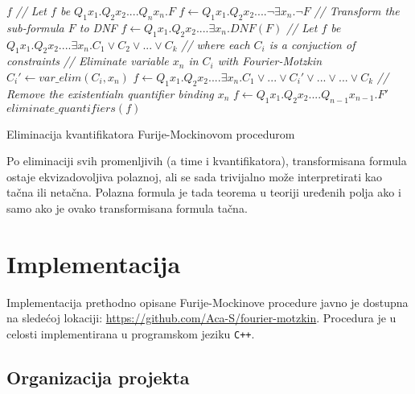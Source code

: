 \documentclass[a4paper,10pt]{article}
\begin{document}
\begin{algorithm}[!ht]
    \begin{algorithmic}[1]
                \State \Return $f$
            \EndIf
            \State \textit{// Let $f$ be $Q_1x_1.Q_2x_2....Q_nx_n.F$}
                \State $f \gets Q_1x_1.Q_2x_2....\neg \exists x_n. \neg F$
            \EndIf
            \State \textit{// Transform the sub-formula $F$ to DNF}
            \State $f \gets Q_1x_1.Q_2x_2....\exists x_n.DNF(F)$
            \State \textit{// Let $f$ be $Q_1x_1.Q_2x_2....\exists x_n.C_1 \lor C_2 \lor ... \lor C_k$}
            \State \textit{// where each $C_i$ is a conjuction of constraints}
                \State \textit{// Eliminate variable $x_n$ in $C_i$ with Fourier-Motzkin}
                \State $C_i' \gets var\_elim(C_i, x_n)$
                \State $f \gets Q_1x_1.Q_2x_2....\exists x_n.C_1 \lor ... \lor C_i' \lor ... \lor ... \lor C_k$
            \EndFor
            \State \textit{// Remove the existentialn quantifier binding $x_n$}
            \State $f \gets Q_1x_1.Q_2x_2....Q_{n-1}x_{n-1}.F'$
            \State \Return $eliminate\_quantifiers(f)$
        \EndFunction
    \end{algorithmic}
    \caption{Eliminacija kvantifikatora Furije-Mockinovom procedurom}
    \label{alg:fm_fol_formula}
\end{algorithm}

Po eliminaciji svih promenljivih (a time i kvantifikatora), transformisana formula ostaje ekvizadovoljiva polaznoj, ali se sada trivijalno može interpretirati kao tačna ili netačna. Polazna formula je tada teorema u teoriji uređenih polja ako i samo ako je ovako transformisana formula tačna.

\section{Implementacija}
\label{sec:implementacija}

Implementacija prethodno opisane Furije-Mockinove procedure javno je dostupna na sledećoj lokaciji: \url{https://github.com/Aca-S/fourier-motzkin}. Procedura je u celosti implementirana u programskom jeziku \texttt{C++}.

\subsection{Organizacija projekta}
\end{document}
